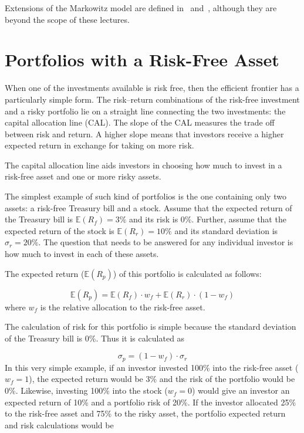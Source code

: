 Extensions of the Markowitz model are defined in~\cite{bib:post_modern_theory} and~\cite{bib:black_litterman}, 
although they are beyond the scope of these lectures. 
    
\section{Portfolios with a Risk-Free Asset}
\label{portfolios-with-a-risk-free-asset}

When one of the investments available is risk free, then the efficient frontier has a particularly simple form. The risk–return combinations of the risk-free investment and a risky portfolio lie on a straight line connecting the two investments: the capital allocation line (CAL). The slope of the CAL measures the trade off between risk and return. A higher slope means that investors receive a higher expected return in exchange for taking on more risk.

The capital allocation line aids investors in choosing how much to invest in a risk-free asset and one or more risky assets.

The simplest example of such kind of portfolios is the one containing only two assets: a risk-free Treasury bill and a stock. Assume that the expected return of the Treasury bill is \(\mathbb{E}(R_f)=3\%\) and its risk is 0\%. Further, assume that the expected return of the stock is \(\mathbb{E}(R_r)=10\%\) and its standard deviation is \(\sigma_r=20\%\). The question that needs to be answered for any individual investor is how much to invest in each of these
assets.

The expected return (\(\mathbb{E}(R_p)\)) of this portfolio is calculated as follows:

\begin{equation*} 
	\mathbb{E}(R_p) = \mathbb{E}(R_f)\cdot w_f + \mathbb{E}(R_r)\cdot (1- w_f) 
\end{equation*}
where \(w_f\) is the relative allocation to the risk-free asset.

The calculation of risk for this portfolio is simple because the standard deviation of the Treasury bill is 0\%. Thus it is calculated as

\begin{equation*} 
	\sigma_p = (1-w_f)\cdot \sigma_r 
\end{equation*}
In this very simple example, if an investor invested 100\% into the risk-free asset (\(w_f=1\)), the expected return would be 3\% and the risk of the portfolio would be 0\%. Likewise, investing 100\% into the stock (\(w_f=0\)) would give an investor an expected return of 10\% and a portfolio risk of 20\%. If the investor allocated 25\% to the risk-free asset and 75\% to the risky asset, the portfolio expected return and risk calculations would be

